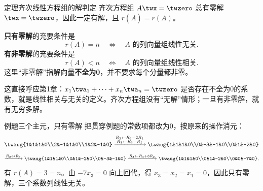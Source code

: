 \documentclass[a4paper,12pt,twoside,openany,fontset=none]{ctexbook}
\newcommand{\R}{\mathbb{R}}
\newcounter{theorem}[chapter]
\newenvironment{theorem}[1][]{\begin{thmBox}{定理}{#1}}{\end{thmBox}}
\newcounter{example}[chapter]
\newenvironment{example}[1][]{\begin{exBox}{例题}{#1}}{\end{exBox}}
\numberwithin{equation}{chapter}
\begin{document}
\begin{theorem}[齐次线性方程组的解判定]
齐次方程组 $A\twx=\twzero$ 总有零解 $\twx=\twzero$，因此一定有解，且 $r(\overline A)=r(A)$。

\textbf{只有零解}的充要条件是
\[
    r(A)=n
    \quad\Longleftrightarrow\quad
    A\text{ 的列向量组线性无关}.
\]
\textbf{有非零解}的充要条件是
\[
    r(A)<n
    \quad\Longleftrightarrow\quad
    A\text{ 的列向量组线性相关}.
\]
这里“非零解”指解向量\textbf{不全为0}，并不要求每个分量都非零。
\end{theorem}

这直接呼应第1章：$x_1\twa_1+\cdots+x_n\twa_n=\twzero$ 是否存在不全为0的系数，就是线性相关与无关的定义。齐次方程组没有“无解”情形；一旦有非零解，就有无穷多解。

\begin{example}[三个主元，只有零解]
把贯穿例题的常数项都改为0，按原来的操作消元：
\[
 \twaug{1&1&1&0\\2&-1&1&0\\1&2&-1&0}
 \xrightarrow{\substack{R_2\leftarrow R_2-2R_1\\R_3\leftarrow R_3-R_1}}
 \twaug{1&1&1&0\\0&-3&-1&0\\0&1&-2&0}
\]
\[
 \xrightarrow{R_2\leftrightarrow R_3}
 \twaug{1&1&1&0\\0&1&-2&0\\0&-3&-1&0}
 \xrightarrow{R_3\leftarrow R_3+3R_2}
 \twaug{1&1&1&0\\0&1&-2&0\\0&0&-7&0}.
\]
有 $r(A)=3=n$。由 $-7x_3=0$ 向上回代，得 $x_3=x_2=x_1=0$，因此只有零解，三个系数列线性无关。
\end{example}
\end{document}

